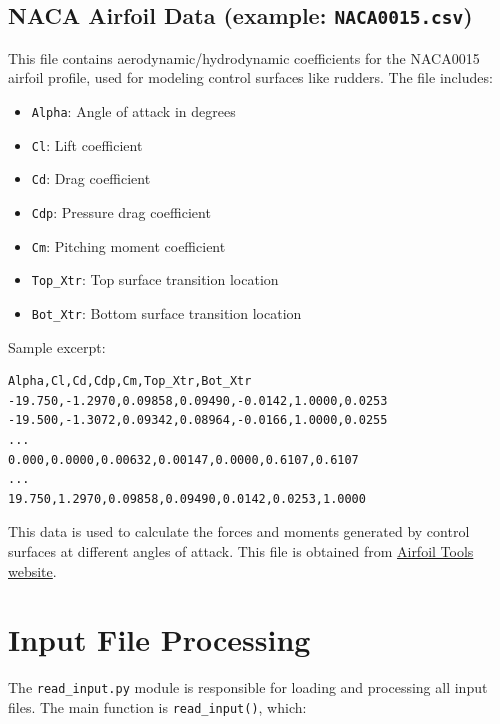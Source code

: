 \documentclass[
  letterpaper,
  DIV=11,
  numbers=noendperiod]{scrreprt}
\providecommand{\tightlist}{%
  \setlength{\itemsep}{0pt}\setlength{\parskip}{0pt}}\usepackage{longtable,booktabs,array}
\begin{document}
\subsection*{\texorpdfstring{NACA Airfoil Data (example:
\texttt{NACA0015.csv})}{NACA Airfoil Data (example: NACA0015.csv)}}\label{naca-airfoil-data-example-naca0015.csv}

This file contains aerodynamic/hydrodynamic coefficients for the
NACA0015 airfoil profile, used for modeling control surfaces like
rudders. The file includes:

\begin{itemize}
\tightlist
\item
  \texttt{Alpha}: Angle of attack in degrees
\item
  \texttt{Cl}: Lift coefficient
\item
  \texttt{Cd}: Drag coefficient
\item
  \texttt{Cdp}: Pressure drag coefficient
\item
  \texttt{Cm}: Pitching moment coefficient
\item
  \texttt{Top\_Xtr}: Top surface transition location
\item
  \texttt{Bot\_Xtr}: Bottom surface transition location
\end{itemize}

Sample excerpt:

\begin{verbatim}
Alpha,Cl,Cd,Cdp,Cm,Top_Xtr,Bot_Xtr
-19.750,-1.2970,0.09858,0.09490,-0.0142,1.0000,0.0253
-19.500,-1.3072,0.09342,0.08964,-0.0166,1.0000,0.0255
...
0.000,0.0000,0.00632,0.00147,0.0000,0.6107,0.6107
...
19.750,1.2970,0.09858,0.09490,0.0142,0.0253,1.0000
\end{verbatim}

This data is used to calculate the forces and moments generated by
control surfaces at different angles of attack. This file is obtained
from \href{http://airfoiltools.com/airfoil/naca0015}{Airfoil Tools
website}.

\section*{Input File Processing}\label{input-file-processing}


The \texttt{read\_input.py} module is responsible for loading and
processing all input files. The main function is \texttt{read\_input()},
which:
\end{document}

